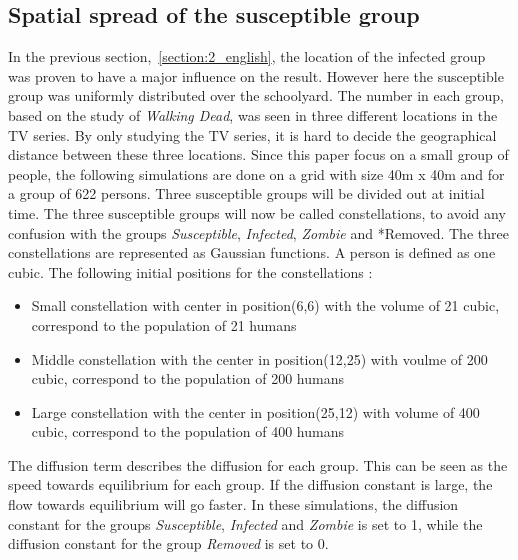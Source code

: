 \documentclass[%
twoside,                 %
final,                   %
chapterprefix=true,      %
open=right               %
10pt]{book}
\begin{document}
\subsection{Spatial spread of the susceptible group}
In the previous section,~\ref{section:2_english}, the location of the infected group was proven to have a major influence on the result. However here the susceptible group was uniformly distributed over the schoolyard. The number in each group, based on the study of \emph{Walking Dead}, was seen in three different locations in the TV series. By only studying the TV series, it is hard to decide the geographical distance between these three locations. Since this paper focus on a small group of people, the following simulations are done on a grid with size 40m x 40m and for a group of 622 persons. Three susceptible groups will be divided out at initial time. The three susceptible groups will now be called constellations, to avoid any confusion with the groups \emph{Susceptible}, \emph{Infected}, \emph{Zombie} and *Removed. The three constellations are represented as Gaussian functions. A person is defined as one cubic. The following initial positions for the constellations : 
\begin{itemize}
\item Small constellation with center in position(6,6) with the volume of 21 cubic, correspond to the population of 21 humans 

\item Middle constellation with the center in position(12,25) with voulme of 200 cubic, correspond to the population of 200 humans

\item Large constellation with the center in position(25,12) with volume of 400 cubic, correspond to the population of 400 humans
\end{itemize}

\noindent
The diffusion term describes the diffusion for each group. This can be seen as the speed towards equilibrium for each group. If the diffusion constant is large, the flow towards equilibrium will go faster. In these simulations, the diffusion constant for the groups \emph{Susceptible}, \emph{Infected} and \emph{Zombie} is set to 1, while the diffusion constant for the group \emph{Removed} is set to 0. 


\vspace{3mm}




\vspace{3mm}
\end{document}

